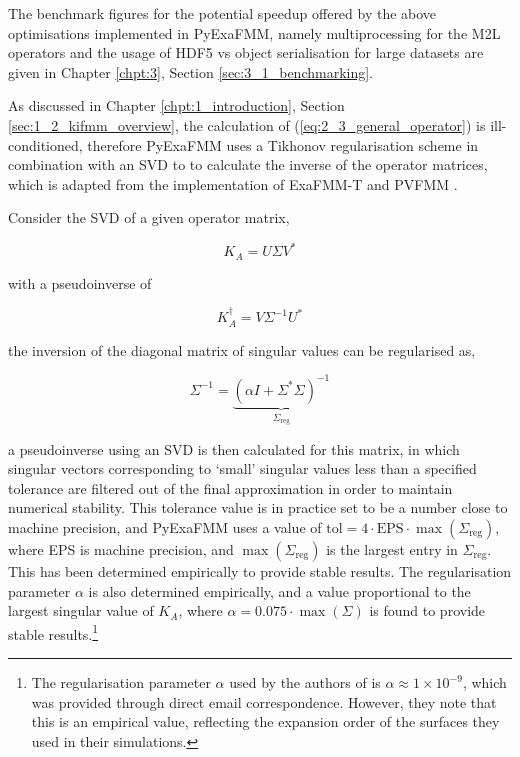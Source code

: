 The  benchmark figures for the potential speedup offered by the above optimisations
implemented in \gls{PyExaFMM}, namely multiprocessing for the \gls{M2L} operators
and the usage of HDF5 vs object serialisation for large datasets are given
in Chapter \ref{chpt:3}, Section \ref{sec:3_1_benchmarking}.

As discussed in Chapter \ref{chpt:1_introduction}, Section \ref{sec:1_2_kifmm_overview},
the calculation of (\ref{eq:2_3_general_operator}) is ill-conditioned, therefore
\gls{PyExaFMM} uses a Tikhonov regularisation scheme in combination with an SVD
to to calculate the inverse of the operator matrices, which is adapted from the
implementation of ExaFMM-T and PVFMM \cite{Malhotra:2015:CCP, exafmm}.

Consider the SVD of a given operator matrix,

\begin{equation}
    K_A = U \Sigma V^*
\end{equation}

with a pseudoinverse of

\begin{equation}
    K_A^\dagger = V \Sigma^{-1} U^*
\end{equation}

the inversion of the diagonal matrix of singular values can be regularised as,

\begin{equation}
    \Sigma^{-1} = \underbrace{(\alpha I + \Sigma^*\Sigma)^{-1}}_{\Sigma_{\text{reg}}}
    \label{eq:2_4_regularised_general_operator}
\end{equation}

a pseudoinverse using an \gls{SVD} is then calculated for this matrix, in which
singular vectors corresponding to `small' singular values less than a specified
tolerance are filtered out of the final approximation in order to maintain
numerical stability. This tolerance value is in practice set to be a number close
to machine precision, and \gls{PyExaFMM} uses a value of $\text{tol} = 4 \cdot \text{EPS} \cdot \max (\Sigma_{\text{reg}})$,
where EPS is machine precision, and $\max (\Sigma_{\text{reg}})$ is the largest
entry in $\Sigma_{\text{reg}}$. This has been determined empirically to provide
stable results. The regularisation parameter $\alpha$ is also determined empirically,
and a value proportional to the largest singular value of $K_A$, where
$\alpha=0.075 \cdot \max(\Sigma)$ is found to provide stable results.\footnote{
    The regularisation parameter $\alpha$ used by the authors of \cite{Malhotra:2015:CCP}
    is $\alpha \approx  1 \times 10^{-9}$, which was provided through direct email correspondence. However,
    they note that this is an empirical value, reflecting the expansion order of
    the surfaces they used in their simulations.
}

